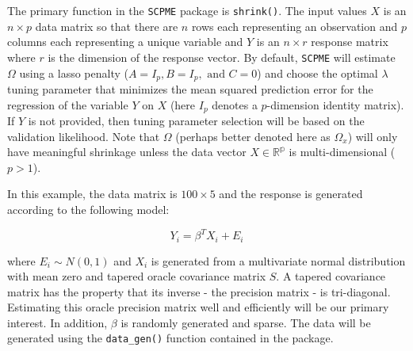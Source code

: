 \documentclass[11pt,]{report}
\newenvironment{Shaded}{\begin{snugshade}}{\end{snugshade}}
\newcommand{\CommentTok}[1]{\textcolor[rgb]{0.56,0.35,0.01}{\textit{#1}}}
\newcommand{\DataTypeTok}[1]{\textcolor[rgb]{0.13,0.29,0.53}{#1}}
\newcommand{\DecValTok}[1]{\textcolor[rgb]{0.00,0.00,0.81}{#1}}
\newcommand{\KeywordTok}[1]{\textcolor[rgb]{0.13,0.29,0.53}{\textbf{#1}}}
\newcommand{\NormalTok}[1]{#1}
\newcommand{\OperatorTok}[1]{\textcolor[rgb]{0.81,0.36,0.00}{\textbf{#1}}}
\newcommand{\StringTok}[1]{\textcolor[rgb]{0.31,0.60,0.02}{#1}}
\begin{document}
The primary function in the \texttt{SCPME} package is \texttt{shrink()}. The input values \(X\) is an \(n \times p\) data matrix so that there are \(n\) rows each representing an observation and \(p\) columns each representing a unique variable and \(Y\) is an \(n \times r\) response matrix where \(r\) is the dimension of the response vector. By default, \texttt{SCPME} will estimate \(\Omega\) using a lasso penalty (\(A = I_{p}, B = I_{p}, \mbox{ and } C = 0\)) and choose the optimal \(\lambda\) tuning parameter that minimizes the mean squared prediction error for the regression of the variable \(Y\) on \(X\) (here \(I_{p}\) denotes a \(p\)-dimension identity matrix). If \(Y\) is not provided, then tuning parameter selection will be based on the validation likelihood. Note that \(\Omega\) (perhaps better denoted here as \(\Omega_{x}\)) will only have meaningful shrinkage unless the data vector \(X \in \mathbb{R^{p}}\) is multi-dimensional (\(p > 1\)).

In this example, the data matrix is \(100 \times 5\) and the response is generated according to the following model:

\[ Y_{i} = \beta^{T}X_{i} + E_{i} \]

where \(E_{i} \sim N\left( 0, 1 \right)\) and \(X_{i}\) is generated from a multivariate normal distribution with mean zero and tapered oracle covariance matrix \(S\). A tapered covariance matrix has the property that its inverse - the precision matrix - is tri-diagonal. Estimating this oracle precision matrix well and efficiently will be our primary interest. In addition, \(\beta\) is randomly generated and sparse. The data will be generated using the \texttt{data\_gen()} function contained in the package.

\vspace{0.5cm}

\begin{Shaded}
\end{Shaded}
\end{document}
